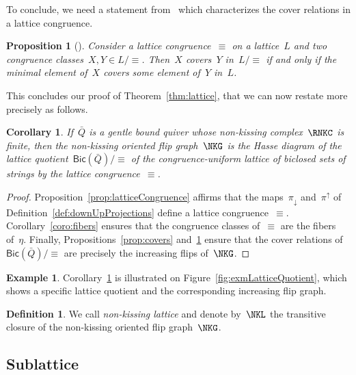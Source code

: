 \documentclass{amsart}
\newtheorem{corollary}[theorem]{Corollary}
\newtheorem{proposition}[theorem]{Proposition}
\theoremstyle{definition}
\newtheorem{definition}[theorem]{Definition}
\newtheorem{example}[theorem]{Example}
\newcommand{\fref}[1]{Figure~\ref{#1}} %
\newcommand{\darkblue}{\color{darkblue}} %
\newcommand{\defn}[1]{\textsl{\darkblue #1}} %
\newcommand{\Bicl}[1]{\mathsf{Bic}(#1)} %
\newcommand{\projDown}{\pi_\downarrow} %
\newcommand{\projUp}{\pi^\uparrow} %
\begin{document}
To conclude, we need a statement from~\cite{Reading-HopfAlgebras} which characterizes the cover relations in a lattice congruence.

\begin{proposition}[{\cite[Prop.~2.2]{Reading-HopfAlgebras}}]
\label{prop:characterizationCoversLatticeQuotient}
Consider a lattice congruence~$\equiv$ on a lattice~$L$ and two congruence classes~$X, Y \in L/{\equiv}$.
Then~$X$ covers~$Y$ in~$L/{\equiv}$ if and only if the minimal element of~$X$ covers some element of~$Y$ in~$L$.
\end{proposition}

This concludes our proof of Theorem~\ref{thm:lattice}, that we can now restate more precisely as follows.

\begin{corollary}
\label{coro:finalLatticeQuotient}
If~$\bar Q$ is a gentle bound quiver whose non-kissing complex~$\RNKC$ is finite, then the non-kissing oriented flip graph~$\NKG$ is the Hasse diagram of the lattice quotient~$\Bicl{\bar Q}/{\equiv}$ of the congruence-uniform lattice of biclosed sets of strings by the lattice congruence~$\equiv$.
\end{corollary}

\begin{proof}
Proposition~\ref{prop:latticeCongruence} affirms that the maps~$\projDown$ and~$\projUp$ of Definition~\ref{def:downUpProjections} define a lattice congruence~$\equiv$.
Corollary~\ref{coro:fibers} ensures that the congruence classes of~$\equiv$ are the fibers of~$\eta$.
Finally, Propositions~\ref{prop:covers} and~\ref{prop:characterizationCoversLatticeQuotient} ensure that the cover relations of~$\Bicl{\bar Q}/{\equiv}$ are precisely the increasing flips of~$\NKG$.
\end{proof}

\begin{example}
Corollary~\ref{coro:finalLatticeQuotient} is illustrated on \fref{fig:exmLatticeQuotient}, which shows a specific lattice quotient and the corresponding increasing flip graph.
\end{example}

\begin{definition}\label{def:NKL}
We call \defn{non-kissing lattice} and denote by~$\NKL$ the transitive closure of the non-kissing oriented flip graph~$\NKG$.
\end{definition}

\subsection{Sublattice}
\end{document}
